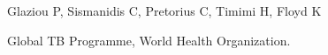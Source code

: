 Glaziou P, Sismanidis C, Pretorius C, Timimi H, Floyd K

Global TB Programme, World Health Organization.
  
  